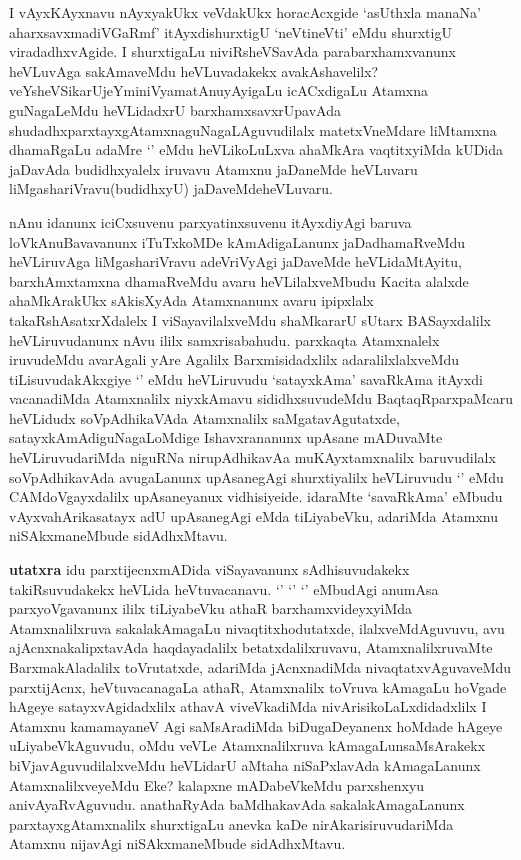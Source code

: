 
\begin{artha}
I vAyxKAyxnavu nAyxyakUkx veVdakUkx horacAcxgide `asUthxla manaNa' aharxsavxmadiVGaRmf' itAyxdishurxtigU  `neVtineVti' eMdu shurxtigU viradadhxvAgide. I shurxtigaLu niviRsheVSavAda parabarxhamxvanunx heVLuvAga sakAmaveMdu heVLuvadakekx avakAshavelilx? veYsheVSikarUjeYminiVyamatAnuyAyigaLu icACxdigaLu Atamxna guNagaLeMdu heVLidadxrU barxhamxsavxrUpavAda shudadhxparxtayxgAtamxnaguNagaLAguvudilalx matetxVneMdare liMtamxna dhamaRgaLu adaMre `\stext' eMdu heVLikoLuLxva ahaMkAra vaqtitxyiMda kUDida jaDavAda budidhxyalelx iruvavu Atamxnu jaDaneMde heVLuvaru liMgashariVravu(budidhxyU) jaDaveMdeheVLuvaru.
\end{artha}

\begin{artha}
nAnu idanunx iciCxsuvenu parxyatinxsuvenu itAyxdiyAgi baruva loVkAnuBavavanunx iTuTxkoMDe kAmAdigaLanunx jaDadhamaRveMdu heVLiruvAga liMgashariVravu adeVriVyAgi jaDaveMde heVLidaMtAyitu, barxhAmxtamxna dhamaRveMdu avaru heVLilalxveMbudu Kacita alalxde ahaMkArakUkx sAkisXyAda Atamxnanunx avaru ipipxlalx takaRshAsatxrXdalelx I viSayavilalxveMdu shaMkararU sUtarx BASayxdalilx heVLiruvudanunx nAvu ililx samxrisabahudu. parxkaqta Atamxnalelx iruvudeMdu avarAgali yAre Agalilx Barxmisidadxlilx adaralilxlalxveMdu tiLisuvudakAkxgiye `\stext' eMdu heVLiruvudu `satayxkAma' savaRkAma itAyxdi vacanadiMda Atamxnalilx niyxkAmavu sididhxsuvudeMdu BaqtaqRparxpaMcaru heVLidudx soVpAdhikaVAda Atamxnalilx saMgatavAgutatxde, satayxkAmAdiguNagaLoMdige Ishavxrananunx upAsane mADuvaMte heVLiruvudariMda niguRNa nirupAdhikavAa muKAyxtamxnalilx baruvudilalx soVpAdhikavAda avugaLanunx upAsanegAgi shurxtiyalilx heVLiruvudu `\stext' eMdu CAMdoVgayxdalilx upAsaneyanux vidhisiyeide. idaraMte `savaRkAma' eMbudu vAyxvahArikasatayx adU upAsanegAgi eMda tiLiyabeVku, adariMda Atamxnu niSAkxmaneMbude sidAdhxMtavu.
\end{artha}

\begin{artha}
 \textbf{utatxra} idu parxtijecnxmADida viSayavanunx sAdhisuvudakekx takiRsuvudakekx heVLida heVtuvacanavu. `\stext' `\stext' `\stext' eMbudAgi anumAsa parxyoVgavanunx ililx tiLiyabeVku athaR barxhamxvideyxyiMda Atamxnalilxruva sakalakAmagaLu nivaqtitxhodutatxde, ilalxveMdAguvuvu, avu ajAcnxnakalipxtavAda haqdayadalilx betatxdalilxruvavu, AtamxnalilxruvaMte BarxmakAladalilx toVrutatxde, adariMda jAcnxnadiMda nivaqtatxvAguvaveMdu parxtijAcnx, heVtuvacanagaLa athaR, Atamxnalilx toVruva kAmagaLu hoVgade hAgeye satayxvAgidadxlilx athavA viveVkadiMda nivArisikoLaLxdidadxlilx I Atamxnu kamamayaneV Agi saMsAradiMda biDugaDeyanenx hoMdade hAgeye uLiyabeVkAguvudu, oMdu veVLe Atamxnalilxruva kAmagaLunsaMsArakekx biVjavAguvudilalxveMdu heVLidarU aMtaha niSaPxlavAda kAmagaLanunx AtamxnalilxveyeMdu Eke? kalapxne mADabeVkeMdu parxshenxyu anivAyaRvAguvudu. anathaRyAda baMdhakavAda sakalakAmagaLanunx parxtayxgAtamxnalilx shurxtigaLu anevka kaDe nirAkarisiruvudariMda Atamxnu nijavAgi niSAkxmaneMbude sidAdhxMtavu.
\end{artha}

